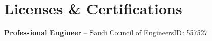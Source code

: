 \section{Licenses \& Certifications}
    \resumeSubHeadingListStart
        \resumeProjectHeading
        {\textbf{Professional Engineer} -- Saudi Council of Engineers}{ID: 557527}
    \resumeSubHeadingListEnd
